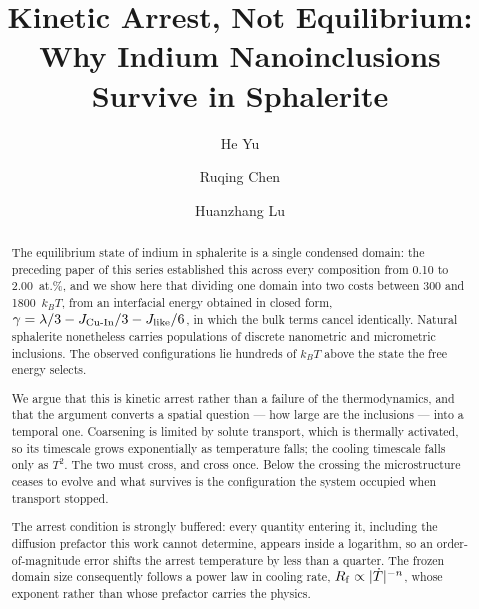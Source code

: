 \documentclass[preprint,12pt,authoryear]{elsarticle}
\begin{document}
\begin{frontmatter}

\title{Kinetic Arrest, Not Equilibrium:\\
Why Indium Nanoinclusions Survive in Sphalerite}

\author[hzu]{He Yu}

\author[gut]{Ruqing Chen}

\author[uqac]{Huanzhang Lu}

\address[hzu]{Geological Laboratory, Hezhou University, Hezhou, Guangxi 542899, China}
\address[gut]{GUT Geoservice Inc., Montreal, Quebec, Canada}
\address[uqac]{D\'epartement des sciences appliqu\'ees et Centre d'\'etudes sur
les ressources min\'erales, Universit\'e du Qu\'ebec \`a Chicoutimi, Quebec, Canada}

\begin{abstract}
\noindent
The equilibrium state of indium in sphalerite is a single condensed domain: the
preceding paper of this series established this across every composition from
0.10 to 2.00~at.\%, and we show here that dividing one domain into two costs
between 300 and 1800~$k_BT$, from an interfacial energy obtained in closed form,
$\gamma = \lambda/3 - J_{\rm Cu\text{-}In}/3 - J_{\rm like}/6$, in which the bulk
terms cancel identically. Natural sphalerite nonetheless carries populations of
discrete nanometric and micrometric inclusions. The observed configurations lie
hundreds of $k_BT$ above the state the free energy selects.

We argue that this is kinetic arrest rather than a failure of the
thermodynamics, and that the argument converts a spatial question --- how large
are the inclusions --- into a temporal one. Coarsening is limited by solute
transport, which is thermally activated, so its timescale grows exponentially as
temperature falls; the cooling timescale falls only as $T^2$. The two must
cross, and cross once. Below the crossing the microstructure ceases to evolve
and what survives is the configuration the system occupied when transport
stopped.

The arrest condition is strongly buffered: every quantity entering it, including
the diffusion prefactor this work cannot determine, appears inside a logarithm,
so an order-of-magnitude error shifts the arrest temperature by less than a
quarter. The frozen domain size consequently follows a power law in cooling
rate, $R_{\rm f} \propto |\dot{T}|^{-n}$, whose exponent rather than whose
prefactor carries the physics.


\end{abstract}
\end{frontmatter}
\end{document}
